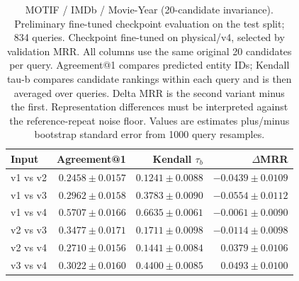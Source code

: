 \begin{table}[t]
\centering
\small
\begin{tabular}{lrrr}
\toprule
Input & Agreement@1 & Kendall $\tau_b$ & $\Delta$MRR \\
\midrule
v1 vs v2 & $0.2458 \pm 0.0157$ & $0.1241 \pm 0.0088$ & $-0.0439 \pm 0.0109$ \\
v1 vs v3 & $0.2962 \pm 0.0158$ & $0.3783 \pm 0.0090$ & $-0.0554 \pm 0.0112$ \\
v1 vs v4 & $0.5707 \pm 0.0166$ & $0.6635 \pm 0.0061$ & $-0.0061 \pm 0.0090$ \\
v2 vs v3 & $0.3477 \pm 0.0171$ & $0.1711 \pm 0.0098$ & $-0.0114 \pm 0.0098$ \\
v2 vs v4 & $0.2710 \pm 0.0156$ & $0.1441 \pm 0.0084$ & $0.0379 \pm 0.0106$ \\
v3 vs v4 & $0.3022 \pm 0.0160$ & $0.4400 \pm 0.0085$ & $0.0493 \pm 0.0100$ \\
\bottomrule
\end{tabular}
\caption{MOTIF / IMDb / Movie-Year (20-candidate invariance). Preliminary fine-tuned checkpoint evaluation on the test split; 834 queries. Checkpoint fine-tuned on physical/v4, selected by validation MRR. All columns use the same original 20 candidates per query. Agreement@1 compares predicted entity IDs; Kendall tau-b compares candidate rankings within each query and is then averaged over queries. Delta MRR is the second variant minus the first. Representation differences must be interpreted against the reference-repeat noise floor. Values are estimates plus/minus bootstrap standard error from 1000 query resamples.}
\label{tab:motif-movie_year-invariance}
\end{table}
